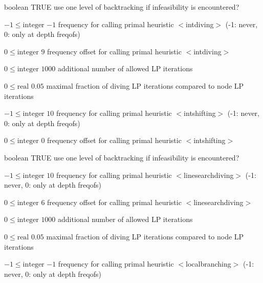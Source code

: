 %
{boolean}%
{TRUE}%
{use one level of backtracking if infeasibility is encountered?}%
{}

%
{$-1\leq\textrm{integer}$}%
{$-1$}%
{frequency for calling primal heuristic $<$intdiving$>$ (-1: never, 0: only at depth freqofs)}%
{}

%
{$0\leq\textrm{integer}$}%
{$9$}%
{frequency offset for calling primal heuristic $<$intdiving$>$}%
{}

%
{$0\leq\textrm{integer}$}%
{$1000$}%
{additional number of allowed LP iterations}%
{}

%
{$0\leq\textrm{real}$}%
{$0.05$}%
{maximal fraction of diving LP iterations compared to node LP iterations}%
{}

%
{$-1\leq\textrm{integer}$}%
{$10$}%
{frequency for calling primal heuristic $<$intshifting$>$ (-1: never, 0: only at depth freqofs)}%
{}

%
{$0\leq\textrm{integer}$}%
{$0$}%
{frequency offset for calling primal heuristic $<$intshifting$>$}%
{}

%
{boolean}%
{TRUE}%
{use one level of backtracking if infeasibility is encountered?}%
{}

%
{$-1\leq\textrm{integer}$}%
{$10$}%
{frequency for calling primal heuristic $<$linesearchdiving$>$ (-1: never, 0: only at depth freqofs)}%
{}

%
{$0\leq\textrm{integer}$}%
{$6$}%
{frequency offset for calling primal heuristic $<$linesearchdiving$>$}%
{}

%
{$0\leq\textrm{integer}$}%
{$1000$}%
{additional number of allowed LP iterations}%
{}

%
{$0\leq\textrm{real}$}%
{$0.05$}%
{maximal fraction of diving LP iterations compared to node LP iterations}%
{}

%
{$-1\leq\textrm{integer}$}%
{$-1$}%
{frequency for calling primal heuristic $<$localbranching$>$ (-1: never, 0: only at depth freqofs)}%
{}

